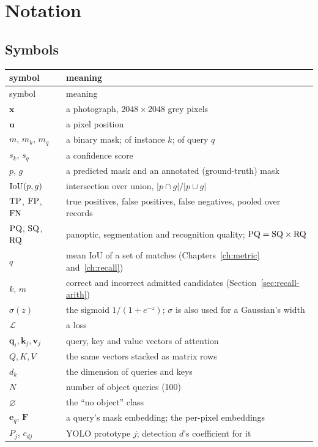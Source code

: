 \chapter{Notation}\label{app:notation}

\section{Symbols}
{\small
\begin{longtable}{@{}p{3.0cm}p{9.3cm}@{}}
\toprule
symbol & meaning \\
\midrule
\endfirsthead
\toprule
symbol & meaning \\
\midrule
\endhead
\bottomrule
\endfoot
$\mathbf{x}$ & a photograph, $2048\times2048$ grey pixels \\
$\mathbf{u}$ & a pixel position \\
$m$, $m_k$, $m_q$ & a binary mask; of instance $k$; of query $q$ \\
$s_k$, $s_q$ & a confidence score \\
$p$, $g$ & a predicted mask and an annotated (ground-truth) mask \\
$\mathrm{IoU}(p,g)$ & intersection over union, $|p\cap g|/|p\cup g|$ \\
$\mathrm{TP}$, $\mathrm{FP}$, $\mathrm{FN}$ & true positives, false positives, false negatives, pooled over records \\
$\mathrm{PQ}$, $\mathrm{SQ}$, $\mathrm{RQ}$ & panoptic, segmentation and recognition quality; $\mathrm{PQ}=\mathrm{SQ}\times\mathrm{RQ}$ \\
$q$ & mean IoU of a set of matches (Chapters~\ref{ch:metric} and~\ref{ch:recall}) \\
$k$, $m$ & correct and incorrect admitted candidates (Section~\ref{sec:recall-arith}) \\
$\sigma(z)$ & the sigmoid $1/(1+e^{-z})$; $\sigma$ is also used for a Gaussian's width \\
$\mathcal{L}$ & a loss \\
$\mathbf{q}_i,\mathbf{k}_j,\mathbf{v}_j$ & query, key and value vectors of attention \\
$Q, K, V$ & the same vectors stacked as matrix rows \\
$d_k$ & the dimension of queries and keys \\
$N$ & number of object queries (100) \\
$\varnothing$ & the ``no object'' class \\
$\mathbf{e}_q$, $\mathbf{F}$ & a query's mask embedding; the per-pixel embeddings \\
$P_j$, $c_{dj}$ & YOLO prototype $j$; detection $d$'s coefficient for it \\

\end{longtable}}
